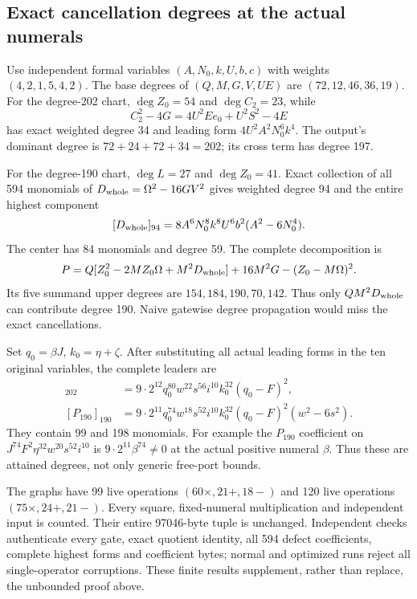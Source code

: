 \subsection{Exact cancellation degrees at the actual numerals}
Use independent formal variables $(A,N_0,k,U,b,c)$ with weights
$(4,2,1,5,4,2)$. The base degrees of $(Q,M,G,V,UE)$ are
$(72,12,46,36,19)$. For the degree-202 chart, $\deg Z_0=54$ and
$\deg C_2=23$, while
\[
 C_2^2-4G=4U^2Ee_0+U^2S^2-4E
\]
has exact weighted degree 34 and leading form $4U^2A^2N_0^6k^4$.
The output's dominant degree is $72+24+72+34=202$; its cross term has
degree 197.

For the degree-190 chart, $\deg L=27$ and $\deg Z_0=41$. Exact
collection of all 594 monomials of $D_{\rm whole}=\Omega^2-16GV^2$
gives weighted degree 94 and the entire highest component
\[
 [D_{\rm whole}]_{94}
 =8A^6N_0^8k^8U^6b^2(A^2-6N_0^4).
\]
The center has 84 monomials and degree 59. The complete decomposition is
\[
 P=Q[Z_0^2-2MZ_0\Omega+M^2D_{\rm whole}]
       +16M^2G-(Z_0-M\Omega)^2.
\]
Its five summand upper degrees are $154,184,190,70,142$. Thus only
$QM^2D_{\rm whole}$ can contribute degree 190. Naive gatewise degree
propagation would miss the exact cancellations.

Set $q_0=\beta J$, $k_0=\eta+\zeta$. After substituting all actual
leading forms in the ten original variables, the complete leaders are
\begin{align*}
 [P_{202}]_{202}
 &=9\cdot2^{12}q_0^{80}w^{22}s^{56}i^{10}k_0^{32}(q_0-F)^2,\\
 [P_{190}]_{190}
 &=9\cdot2^{11}q_0^{74}w^{18}s^{52}i^{10}k_0^{32}
       (q_0-F)^2(w^2-6s^2).
\end{align*}
They contain 99 and 198 monomials. For example the $P_{190}$ coefficient
on $J^{74}F^2\eta^{32}w^{20}s^{52}i^{10}$ is
$9\cdot2^{11}\beta^{74}\ne0$ at the actual positive numeral $\beta$.
Thus these are attained degrees, not only generic free-port bounds.

The graphs have 99 live operations $(60\times,21+,18-)$ and 120 live
operations $(75\times,24+,21-)$. Every square, fixed-numeral multiplication
and independent input is counted. Their entire 97046-byte tuple is unchanged.
Independent checks authenticate every gate, exact quotient identity, all
594 defect coefficients, complete highest forms and coefficient bytes;
normal and optimized runs reject all single-operator corruptions. These
finite results supplement, rather than replace, the unbounded proof above.
